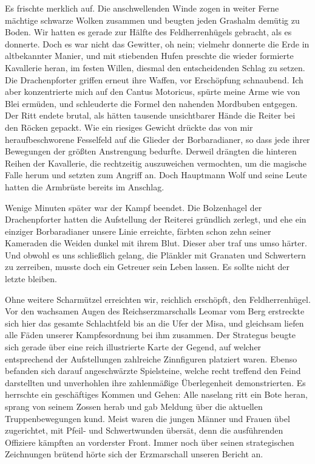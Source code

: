 Es frischte merklich auf. Die anschwellenden Winde zogen in weiter Ferne mächtige schwarze Wolken zusammen und beugten jeden Grashalm demütig zu Boden. Wir hatten es gerade zur Hälfte des Feldherrenhügels gebracht, als es donnerte. Doch es war nicht das Gewitter, oh nein; vielmehr donnerte die Erde in altbekannter Manier, und mit stiebenden Hufen preschte die wieder formierte Kavallerie heran, im festen Willen, diesmal den entscheidenden Schlag zu setzen. Die Drachenpforter griffen erneut ihre Waffen, vor Erschöpfung schnaubend. Ich aber konzentrierte mich auf den Cantus Motoricus, spürte meine Arme wie von Blei ermüden, und schleuderte die Formel den nahenden Mordbuben entgegen. Der Ritt endete brutal, als hätten tausende unsichtbarer Hände die Reiter bei den Röcken gepackt. Wie ein riesiges Gewicht drückte das von mir heraufbeschworene Fesselfeld auf die Glieder der Borbaradianer, so dass jede ihrer Bewegungen der größten Anstrengung bedurfte. Derweil drängten die hinteren Reihen der Kavallerie, die rechtzeitig auszuweichen vermochten, um die magische Falle herum und setzten zum Angriff an. Doch Hauptmann Wolf und seine Leute hatten die Armbrüste bereits im Anschlag.

Wenige Minuten später war der Kampf beendet. Die Bolzenhagel der Drachenpforter hatten die Aufstellung der Reiterei gründlich zerlegt, und ehe ein einziger Borbaradianer unsere Linie erreichte, färbten schon zehn seiner Kameraden die Weiden dunkel mit ihrem Blut. Dieser aber traf uns umso härter. Und obwohl es uns schließlich gelang, die Plänkler mit Granaten und Schwertern zu zerreiben, musste doch ein Getreuer sein Leben lassen. Es sollte nicht der letzte bleiben.

Ohne weitere Scharmützel erreichten wir, reichlich erschöpft, den Feldherrenhügel. Vor den wachsamen Augen des Reichserzmarschalls Leomar vom Berg erstreckte sich hier das gesamte Schlachtfeld bis an die Ufer der Misa, und gleichsam liefen alle Fäden unserer Kampfesordnung bei ihm zusammen. Der Strategus beugte sich gerade über eine reich illustrierte Karte der Gegend, auf welcher entsprechend der Aufstellungen zahlreiche Zinnfiguren platziert waren. Ebenso befanden sich darauf angeschwärzte Spielsteine, welche recht treffend den Feind darstellten und unverhohlen ihre zahlenmäßige Überlegenheit demonstrierten. Es herrschte ein geschäftiges Kommen und Gehen: Alle naselang ritt ein Bote heran, sprang von seinem Zossen herab und gab Meldung über die aktuellen Truppenbewegungen kund. Meist waren die jungen Männer und Frauen übel zugerichtet, mit Pfeil- und Schwertwunden übersät, denn die ausführenden Offiziere kämpften an vorderster Front. Immer noch über seinen strategischen Zeichnungen brütend hörte sich der Erzmarschall unseren Bericht an.

